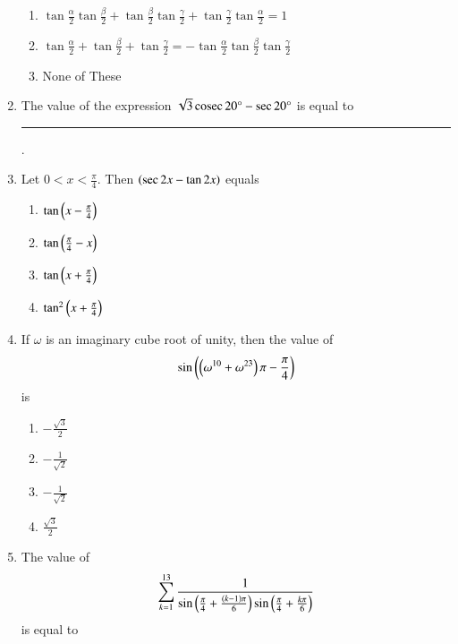 \begin{enumerate}[label=\thesubsection.\arabic*,ref=\thesubsection.\theenumi]
\begin{enumerate}
%  
%  
			\item $\tan\frac{\alpha}{2}\tan\frac{\beta}{2} + \tan\frac{\beta}{2}\tan\frac{\gamma}{2}+ \tan\frac{\gamma}{2}\tan\frac{\alpha}{2} = 1$
%  
			\item $\tan\frac{\alpha}{2} + \tan\frac{\beta}{2} + \tan\frac{\gamma}{2} = -\tan\frac{\alpha}{2}\tan\frac{\beta}{2}\tan\frac{\gamma}{2}$
%  
			\item None of These
%  
% 
		\end{enumerate}
	\item The value of the expression $\sqrt{3}\,\text{cosec}\, 20\degree - \sec 20\degree $ is equal to 
\rule{1cm}{0.1pt}.
		\hfill{}
%  
%  
    \item Let $0<x<\frac{\pi}{4}$. Then $\left(\sec{2x} - \tan{2x}\right)$ equals
%        
        \hfill{}
        \begin{multicols}{4}
\begin{enumerate}
                \item $\tan{\ensuremath{\left(x-\frac{\pi}{4}\right)}}$
                \item $\tan{\ensuremath{\left(\frac{\pi}{4}-x\right)}}$
                \item $\tan{\ensuremath{\left(x+\frac{\pi}{4}\right)}}$ 
                \item $\tan^{2}{\left(x+\frac{\pi}{4}\right)}$
        \end{enumerate}
\end{multicols}
    \item If $\omega$ is an imaginary cube root of unity, then the value of 
        \hfill{}
	    $$\sin{\ensuremath{\left(\left(\omega^{10} + \omega^{23}\right)\pi - \frac{\pi}{4}\right)}}$$ is
%    
        \begin{multicols}{4}
\begin{enumerate}
                \item $-\frac{\sqrt{3}}{2}$
                \item $-\frac{1}{\sqrt{2}}$
                \item $-\frac{1}{\sqrt{2}}$
                \item $\frac{\sqrt{3}}{2}$
        \end{enumerate}
\end{multicols}
\item The value of 
\begin{align*}
\sum_{k=1}^{13} \frac{1}{\sin\left(\frac{\pi}{4} + \frac{\left(k-1\right)\pi}{6}\right)\sin\left(\frac{\pi}{4} + \frac{k\pi}{6}\right)}
\end{align*}
is equal to
\hfill{}
\begin{multicols}{4}

\end{multicols}
\end{enumerate}
